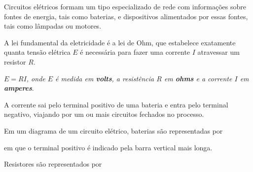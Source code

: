 \documentclass{beamer}
\begin{document}
    \begin{frame}
        Circuitos elétricos formam um tipo especializado de rede com informações sobre fontes de energia, \pause tais como baterias, \pause e dispositivos alimentados por essas fontes, tais como lâmpadas ou motores.\pause

        \vspace{1cm}

        A lei fundamental da eletricidade é a \textrm{lei de Ohm}, \pause que estabelece exatamente quanta tensão elétrica $E$ \pause é necessária para fazer uma corrente $I$ \pause atravessar um resistor $R$.\pause

        \vspace{1cm}
        \begin{tcolorbox}[colback=green!30, colframe=green!80!blue, title=Lei de Ohm]
            \textit{$E = RI$, \pause onde $E$ é medida em \textbf{volts}, \pause a resistência $R$ em \textbf{ohms} \pause e a corrente $I$ em \textbf{amperes}}.
        \end{tcolorbox}
        
    \end{frame}

    \begin{frame}

        A corrente sai pelo terminal positivo de uma bateria \pause e entra pelo terminal negativo, \pause viajando por um ou mais circuitos fechados no processo.\pause

        \vspace{1cm}

        Em um diagrama de um circuito elétrico, baterias são representadas por
        \begin{center}
        \end{center}\pause
        em que o terminal positivo é indicado pela barra vertical mais longa.\pause

        \vspace{1cm}

        Resistores são representados por
        \begin{center}
        \end{center}
    \end{frame}
\end{document}
